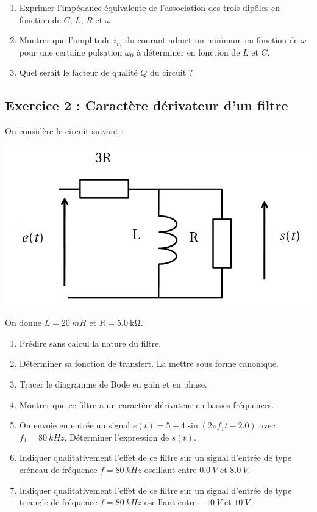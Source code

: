 \begin{enumerate}
	\item Exprimer l'impédance équivalente de l'association des trois dipôles en fonction de $C$, $L$, $R$ et $\omega$.
	\item Montrer que l'amplitude $i_m$ du courant admet un minimum en fonction de $\omega$ pour une certaine pulsation $\omega_0$ à déterminer en fonction de $L$ et $C$.
	\item Quel serait le facteur de qualité $Q$ du circuit ?
\end{enumerate}

\subsection{Exercice 2 : Caractère dérivateur d'un filtre}

On considère le circuit suivant : 

\includegraphics[width = \textwidth]{./Images/mpsi_s19_ex02.png}

On donne $L = \SI{20}{mH}$ et $R = \SI{5.0}{\kilo\ohm}$.

\begin{enumerate}
	\item Prédire sans calcul la nature du filtre.
	\item Déterminer sa fonction de transfert. La mettre sous forme canonique.
	\item Tracer le diagramme de Bode en gain et en phase.
	\item Montrer que ce filtre a un caractère dérivateur en basses fréquences.
	\item On envoie en entrée un signal $e(t) = 5 + 4\sin(2\pi f_1 t -2.0)$ avec $f_1 = \SI{80}{kHz}$. Déterminer l'expression de $s(t)$.
	\item Indiquer qualitativement l'effet de ce filtre sur un signal d'entrée de type créneau de fréquence $f = \SI{80}{kHz}$ oscillant entre $\SI{0.0}{V}$ et $\SI{8.0}{V}$.
	\item Indiquer qualitativement l'effet de ce filtre sur un signal d'entrée de type triangle de fréquence $f = \SI{80}{kHz}$ oscillant entre $\SI{-10}{V}$ et $\SI{10}{V}$.
\end{enumerate}

